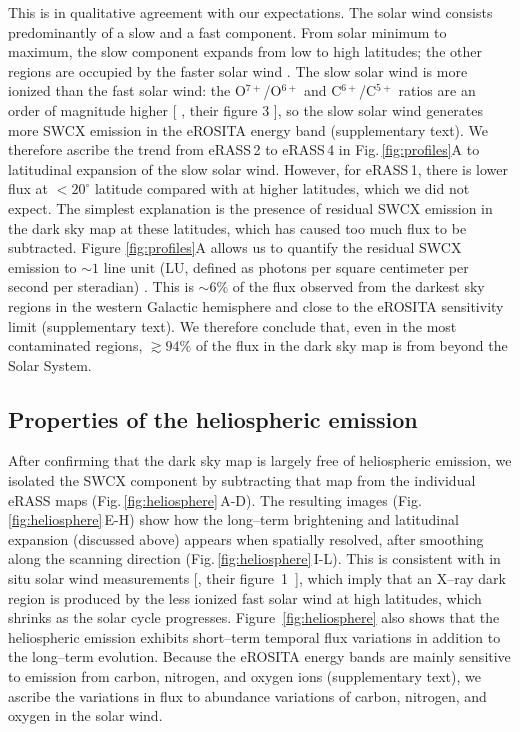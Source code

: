 \documentclass[12pt]{article}
\renewcommand{\deg}{^{\circ}}
\newcommand{\erass}{eRASS\,}
\begin{document}
This is in qualitative agreement with our expectations. The solar wind consists predominantly of a slow and a fast component. From solar minimum to maximum, the slow component expands from low to high latitudes; the other regions are occupied by the faster solar wind \cite{mcc08b}. The slow solar wind is more ionized than the fast solar wind: the O$^{7+}$/O$^{6+}$ and C$^{6+}$/C$^{5+}$ ratios are an order of magnitude higher [ \cite{kou24a}, their figure 3 ], so the slow solar wind generates more SWCX emission in the eROSITA energy band (supplementary text). We therefore ascribe the trend from \erass2 to \erass4 in Fig.\,\ref{fig:profiles}A to latitudinal expansion of the slow solar wind. However, for \erass1, there is lower flux at $<20\deg$ latitude compared with at higher latitudes, which we did not expect. The simplest explanation is the presence of residual SWCX emission in the dark sky map at these latitudes, which has caused too much flux to be subtracted. Figure \ref{fig:profiles}A allows us to quantify the residual SWCX emission to $\sim1\mbox{ line unit}$ (LU, defined as photons per square centimeter per second per steradian) \cite{methods}. This is $\sim6\%$ of the flux observed from the darkest sky regions in the western Galactic hemisphere and close to the eROSITA sensitivity limit (supplementary text). We therefore conclude that, even in the most contaminated regions, $\gtrsim94\mbox{\%}$ of the flux in the dark sky map is from beyond the Solar System.

\subsection*{Properties of the heliospheric emission}

After confirming that the dark sky map is largely free of heliospheric emission, we isolated the SWCX component by subtracting that map from the individual eRASS maps (Fig.\,\ref{fig:heliosphere}\,A-D). The resulting images (Fig.\,\ref{fig:heliosphere}\,E-H) show how the long--term brightening and latitudinal expansion (discussed above) appears when spatially resolved, after smoothing along the scanning direction (Fig.\,\ref{fig:heliosphere}\,I-L). This is consistent with in situ solar wind measurements [\cite{mcc08b}, their figure~1~], which imply that an X--ray dark region is produced by the less ionized fast solar wind at high latitudes, which shrinks as the solar cycle progresses. Figure~\ref{fig:heliosphere} also shows that the heliospheric emission exhibits short--term temporal flux variations in addition to the long--term evolution. Because the eROSITA energy bands are mainly sensitive to emission from carbon, nitrogen, and oxygen ions (supplementary text), we ascribe the variations in flux to abundance variations of carbon, nitrogen, and oxygen in the solar wind.
\end{document}
